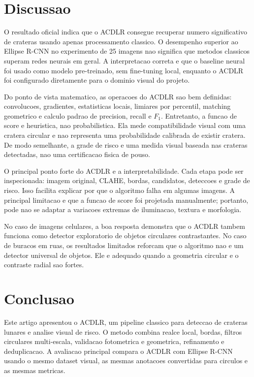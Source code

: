 \documentclass[12pt,a4paper]{article}
\begin{document}
\section{Discussao}

O resultado oficial indica que o ACDLR consegue recuperar numero significativo de crateras usando apenas processamento classico. O desempenho superior ao Ellipse R-CNN no experimento de 25 imagens nao significa que metodos classicos superam redes neurais em geral. A interpretacao correta e que o baseline neural foi usado como modelo pre-treinado, sem fine-tuning local, enquanto o ACDLR foi configurado diretamente para o dominio visual do projeto.

Do ponto de vista matematico, as operacoes do ACDLR sao bem definidas: convolucoes, gradientes, estatisticas locais, limiares por percentil, matching geometrico e calculo padrao de precision, recall e $F_1$. Entretanto, a funcao de score e heuristica, nao probabilistica. Ela mede compatibilidade visual com uma cratera circular e nao representa uma probabilidade calibrada de existir cratera. De modo semelhante, a grade de risco e uma medida visual baseada nas crateras detectadas, nao uma certificacao fisica de pouso.

O principal ponto forte do ACDLR e a interpretabilidade. Cada etapa pode ser inspecionada: imagem original, CLAHE, bordas, candidatos, deteccoes e grade de risco. Isso facilita explicar por que o algoritmo falha em algumas imagens. A principal limitacao e que a funcao de score foi projetada manualmente; portanto, pode nao se adaptar a variacoes extremas de iluminacao, textura e morfologia.

No caso de imagens celulares, a boa resposta demonstra que o ACDLR tambem funciona como detector exploratorio de objetos circulares contrastantes. No caso de buracos em ruas, os resultados limitados reforcam que o algoritmo nao e um detector universal de objetos. Ele e adequado quando a geometria circular e o contraste radial sao fortes.

\section{Conclusao}

Este artigo apresentou o ACDLR, um pipeline classico para deteccao de crateras lunares e analise visual de risco. O metodo combina realce local, bordas, filtros circulares multi-escala, validacao fotometrica e geometrica, refinamento e deduplicacao. A avaliacao principal compara o ACDLR com Ellipse R-CNN usando o mesmo dataset visual, as mesmas anotacoes convertidas para circulos e as mesmas metricas.
\end{document}
